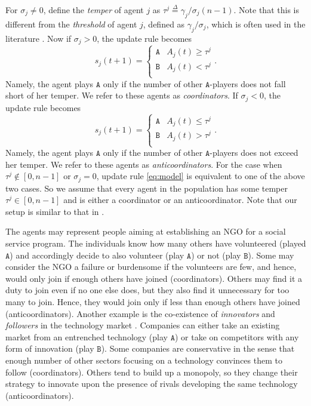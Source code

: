 \documentclass[10 pt,twocolumn,journal]{IEEEtran}
\theoremstyle{plain}
\newcommand{\A}{\mathcal{A}}
\renewcommand{\A}{\mathtt{A}}
\newcommand{\B}{\mathtt{B}}
\theoremstyle{definition}
\begin{document}
For $\sigma_j\neq 0$, define the \emph{temper} of agent $j$ as $\tau^j\overset{\Delta}{=} \gamma_j/\sigma_j (n-1)$.
Note that this is different from the \emph{threshold} of agent $j$, defined as $\gamma_j/\sigma_j$, which is often used in the literature \cite{riehl2018survey}.
Now if $\sigma_j>0$, the update rule becomes
\begin{equation}
	s_j(t+1)=
	\begin{cases}
	    \A &A_j(t)\geq \tau^j\\
	    \B &A_j(t)< \tau^j\\
	\end{cases}.
	\label{eq:coor}
\end{equation}
Namely, the agent plays $\A$ only if the number of other $\A$-players does not fall short of her temper.
We refer to these agents as \emph{coordinators}.
If $\sigma_j<0$, the update rule becomes
\begin{equation}
	s_j(t+1)=
	\begin{cases}
	    \A &A_j(t) \leq \tau^j\\
	    \B &A_j(t) > \tau^j\\
	\end{cases}.
	\label{eq:anti}
\end{equation}
Namely, the agent plays $\A$ only if the number of other $\A$-players does not exceed her temper. 
We refer to these agents as \emph{anticoordinators}.
For the case when $\tau^j \not\in [0,n-1]$ or $\sigma_j = 0$, update rule \eqref{eq:model} is equivalent to one of the above two cases.
So we assume that every agent in the population has some temper $\tau^j\in[0,n-1]$ and is either a coordinator or an anticoordinator.
Note that our setup is similar to that in \cite{Ramazi2016a}.

The agents may represent people aiming at establishing an NGO for a social service program. 
The individuals know how many others have volunteered (played $\A$) and accordingly decide to also volunteer (play $\A$) or not (play $\B$). 
Some may consider the NGO a failure or burdensome if the volunteers are few, and hence, would only join if enough others have joined (coordinators).
Others may find it a duty to join even if no one else does, but they also find it unnecessary for too many to join.
Hence, they would join only if less than enough others have joined (anticoordinators).
Another example is the co-existence of \emph{innovators} and
\emph{followers} in the technology market \cite{helpman1992}. 
Companies can either take an existing market from an entrenched technology (play $\A$) or take on competitors with any form of innovation (play $\B$). 
Some companies are conservative in the sense that enough number of other sectors focusing on a technology convinces them to follow (coordinators).
Others tend to build up a monopoly, so they change their strategy to innovate upon the presence of rivals developing the same technology (anticoordinators).
\end{document}
